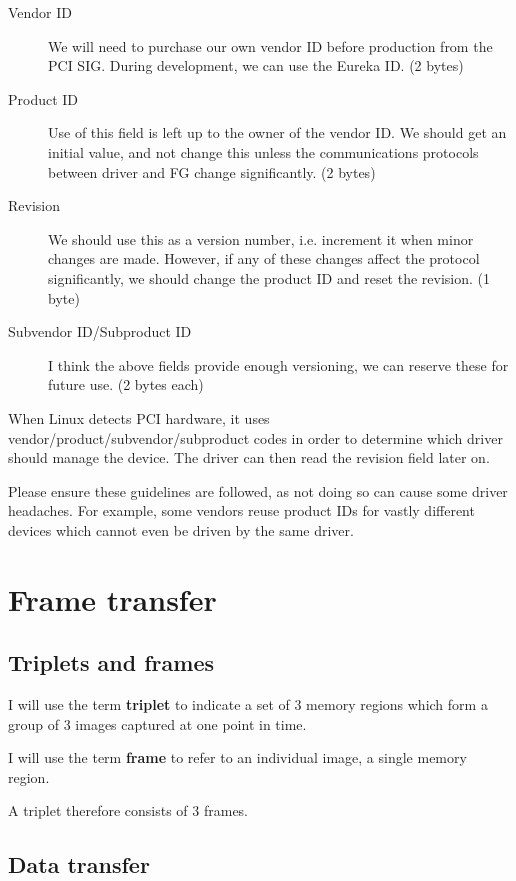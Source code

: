 \documentclass[12pt]{article}
\begin{document}
\begin{description}
\item[Vendor ID] We will need to purchase our own vendor ID before production from the PCI SIG. During development, we can use the Eureka ID. (2 bytes)
\item[Product ID] Use of this field is left up to the owner of the vendor ID. We should get an initial value, and not change this unless the communications protocols between driver and FG change significantly. (2 bytes)
\item[Revision] We should use this as a version number, i.e. increment it when minor changes are made. However, if any of these changes affect the protocol significantly, we should change the product ID and reset the revision. (1 byte)
\item[Subvendor ID/Subproduct ID] I think the above fields provide enough versioning, we can reserve these for future use. (2 bytes each)
\end{description}

When Linux detects PCI hardware, it uses vendor/product/subvendor/subproduct codes in order to determine which driver should manage the device. The driver can then read the revision field later on.

Please ensure these guidelines are followed, as not doing so can cause some driver headaches. For example, some vendors reuse product IDs for vastly different devices which cannot even be driven by the same driver.

\section{Frame transfer}

\subsection{Triplets and frames}

I will use the term \textbf{triplet} to indicate a set of 3 memory regions which form a group of 3 images captured at one point in time.

I will use the term \textbf{frame} to refer to an individual image, a single memory region.

A triplet therefore consists of 3 frames.

\subsection{Data transfer}
\end{document}

